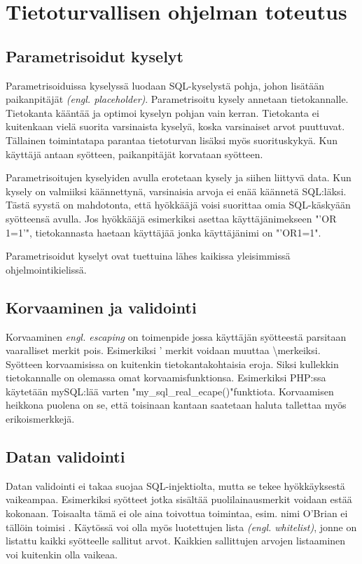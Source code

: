 \documentclass[finnish]{tktltiki2}
\theoremstyle{definition}
\theoremstyle{remark}
\begin{document}
	
	\section {Tietoturvallisen ohjelman toteutus}
		\subsection{Parametrisoidut kyselyt}
		Parametrisoiduissa kyselyssä luodaan SQL-kyselystä pohja, johon lisätään paikanpitäjät \textit{(engl. placeholder)}. Parametrisoitu kysely annetaan tietokannalle. Tietokanta kääntää ja optimoi kyselyn pohjan vain kerran. Tietokanta ei kuitenkaan vielä suorita varsinaista kyselyä, koska varsinaiset arvot puuttuvat. Tällainen toimintatapa parantaa tietoturvan lisäksi myös suorituskykyä. Kun käyttäjä antaan syötteen, paikanpitäjät korvataan syötteen.
		
		Parametrisoitujen kyselyiden avulla erotetaan kysely ja siihen liittyvä data. Kun kysely on valmiiksi käännettynä, varsinaisia arvoja ei enää käännetä SQL:läksi. Tästä syystä on mahdotonta, että hyökkääjä voisi suorittaa omia SQL-käskyään syötteensä avulla. Jos hyökkääjä esimerkiksi asettaa käyttäjänimekseen "'OR 1=1'", tietokannasta haetaan käyttäjää jonka käyttäjänimi on "'OR1=1".
		
		Parametrisoidut kyselyt ovat tuettuina lähes kaikissa yleisimmissä ohjelmointikielissä.
		
		\subsection{Korvaaminen ja validointi}
		Korvaaminen \textit{engl. escaping} on toimenpide jossa käyttäjän syötteestä parsitaan vaaralliset merkit pois. Esimerkiksi ' merkit voidaan muuttaa \textbackslash merkeiksi. Syötteen korvaamisissa on kuitenkin tietokantakohtaisia eroja. Siksi kullekkin tietokannalle on olemassa omat korvaamisfunktionsa. Esimerkiksi PHP:ssa käytetään mySQL:lää varten "my{\_}sql{\_}real{\_}ecape()"\space funktiota. Korvaamisen heikkona puolena on se, että toisinaan kantaan saatetaan haluta tallettaa myös erikoismerkkejä.
		
		\subsection{Datan validointi}
		Datan validointi ei takaa suojaa SQL-injektiolta, mutta se tekee hyökkäyksestä vaikeampaa. Esimerkiksi syötteet jotka sisältää puolilainausmerkit voidaan estää kokonaan. Toisaalta tämä ei ole aina toivottua toimintaa, esim. nimi O'Brian ei tällöin toimisi \cite{validointi}. 
		Käytössä voi olla myös luotettujen lista \textit{(engl. whitelist)}, jonne on listattu kaikki syötteelle sallitut arvot. Kaikkien sallittujen arvojen listaaminen voi kuitenkin olla vaikeaa.
		
\end{document}
